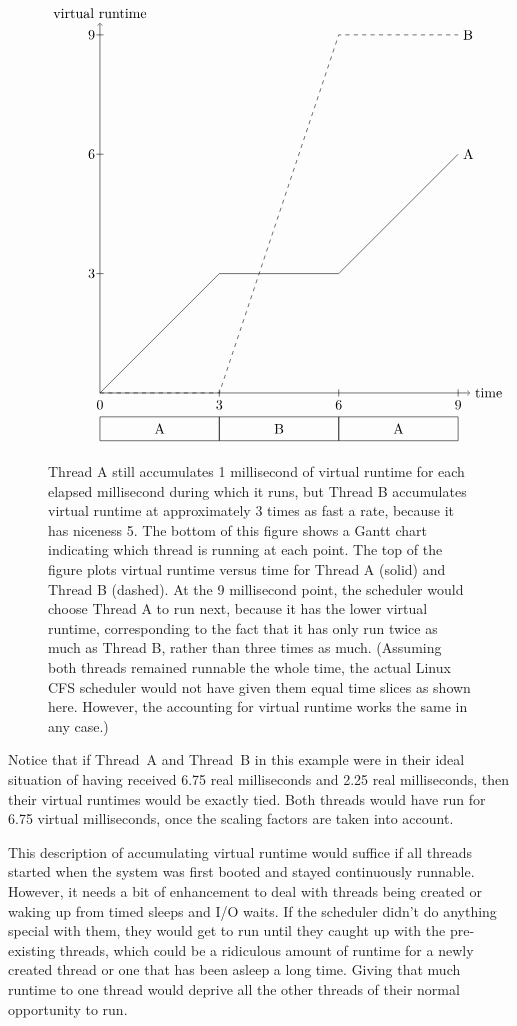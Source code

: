 \begin{figure}
\[\begin{tikzpicture}[scale=.03]
\draw (0,0) rectangle (100,20);
\draw (100,0) rectangle (200,20);
\draw (200,0) rectangle (300,20);
\draw (50,10) node{A};
\draw (150,10) node{B};
\draw (250,10) node{A};
\draw (0,30) node{0};
\draw (100,30) node{3};
\draw (100,37) -- (100,43);
\draw (200,30) node{6};
\draw (200,37) -- (200,43);
\draw (300,30) node{9};
\draw (300,37) -- (300,43);
\draw[->] (0,40) -- (310,40) node[right] {time};
\draw[->] (0,40) -- (0,350) node[above] {virtual runtime};
\draw (0,40) -- (100,140) -- (200,140) -- (300, 240) node[right] {A};
\draw[dashed] (0,40) -- (100,40) -- (200,340) -- (300, 340) node[right] {B};
\draw (-7,140) node{3};
\draw (-3,140) -- (3,140);
\draw (-7,240) node{6};
\draw (-3,240) -- (3,240);
\draw (-7,340) node{9};
\draw (-3,340) -- (3,340);
\end{tikzpicture}\]
\caption{Thread A still accumulates 1 millisecond of virtual
runtime for each elapsed millisecond during which it runs, but Thread B accumulates virtual
runtime at approximately 3 times as fast a rate, because it has niceness 5.  The bottom of this figure shows a Gantt
chart indicating which thread is running at each point.  The top of the figure plots virtual runtime versus time
for Thread A (solid) and Thread B (dashed). At the 9 millisecond point, the scheduler would choose
Thread A to run next, because it has the lower virtual runtime, corresponding to the fact that it has
only run twice as much as Thread B, rather than three times as much.
(Assuming both threads remained runnable the whole time, the actual Linux CFS scheduler
would not have given them equal time slices as shown here.  However, the accounting for
virtual runtime works the same in any case.)}\label{proportional-virtual-runtime-figure}
\end{figure}

Notice that if Thread~A and Thread~B in this example were in their ideal
situation of having received 6.75 real milliseconds and 2.25 real milliseconds,
then their virtual runtimes would be exactly tied.  Both threads would
have run for 6.75 virtual milliseconds, once the scaling factors are taken into account.

This description of accumulating virtual runtime would suffice if all
threads started when the system was first booted and stayed
continuously runnable.  However, it needs a bit of
enhancement to deal with threads being created or waking up from timed sleeps and I/O waits.
If the scheduler didn't do anything special with them, they would get
to run until they caught up with the pre-existing threads, which could
be a ridiculous amount of runtime for a newly created thread or one that
has been asleep a long time.  Giving that much runtime to one thread would
deprive all the other threads of their normal opportunity to run.

